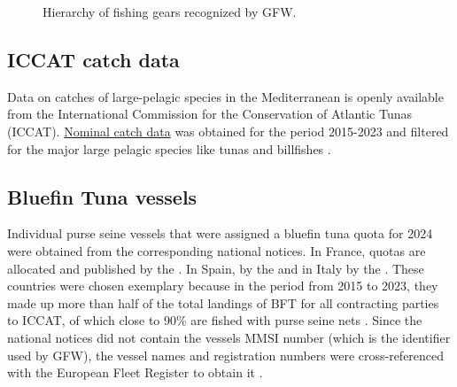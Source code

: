 \medskip

\begin{figure}[htbp]
	\centering
	\medskip
	\caption{Hierarchy of fishing gears recognized by GFW.}
	\label{fig:vessel_classification}
\end{figure}

\subsection{ICCAT catch data}
Data on catches of large-pelagic species in the Mediterranean is openly available from the
International Commission for the Conservation of Atlantic Tunas (ICCAT).
\href{https://www.iccat.int/en/accesingdb.htm}{Nominal catch data} was obtained for the period
2015-2023 and filtered for the major large pelagic species like tunas and billfishes
\citep{iccat_catches}.

\subsection{Bluefin Tuna vessels}
Individual purse seine vessels that were assigned a bluefin tuna quota for 2024 were obtained from
the corresponding national notices. In France, quotas are allocated and published by the
\cite{registry_france}. In Spain, by the \cite{registry_spain} and in Italy by the
\cite{registry_italy}. These countries were chosen exemplary because in the period from 2015 to
2023, they made up more than half of the total landings of BFT for all contracting parties to
ICCAT, of which close to 90\% are fished with purse seine nets \citep{iccat_bft_summary}. Since the
national notices did not contain the vessels MMSI number (which is the identifier used by GFW), the
vessel names and registration numbers were cross-referenced with the European Fleet Register to
obtain it \citep{eu_fleet_register}.

